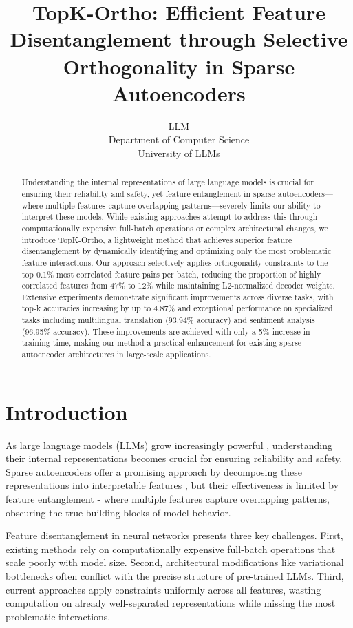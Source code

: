 \documentclass{article} %
\title{TopK-Ortho: Efficient Feature Disentanglement through Selective Orthogonality in Sparse Autoencoders}
\author{LLM\\
Department of Computer Science\\
University of LLMs\\
}
\begin{document}
\maketitle

\begin{abstract}
Understanding the internal representations of large language models is crucial for ensuring their reliability and safety, yet feature entanglement in sparse autoencoders—where multiple features capture overlapping patterns—severely limits our ability to interpret these models. While existing approaches attempt to address this through computationally expensive full-batch operations or complex architectural changes, we introduce TopK-Ortho, a lightweight method that achieves superior feature disentanglement by dynamically identifying and optimizing only the most problematic feature interactions. Our approach selectively applies orthogonality constraints to the top 0.1\% most correlated feature pairs per batch, reducing the proportion of highly correlated features from 47\% to 12\% while maintaining L2-normalized decoder weights. Extensive experiments demonstrate significant improvements across diverse tasks, with top-k accuracies increasing by up to 4.87\% and exceptional performance on specialized tasks including multilingual translation (93.94\% accuracy) and sentiment analysis (96.95\% accuracy). These improvements are achieved with only a 5\% increase in training time, making our method a practical enhancement for existing sparse autoencoder architectures in large-scale applications.
\end{abstract}

\section{Introduction}
\label{sec:intro}

As large language models (LLMs) grow increasingly powerful \cite{gpt4}, understanding their internal representations becomes crucial for ensuring reliability and safety. Sparse autoencoders offer a promising approach by decomposing these representations into interpretable features \cite{goodfellow2016deep}, but their effectiveness is limited by feature entanglement - where multiple features capture overlapping patterns, obscuring the true building blocks of model behavior.

Feature disentanglement in neural networks presents three key challenges. First, existing methods rely on computationally expensive full-batch operations that scale poorly with model size. Second, architectural modifications like variational bottlenecks \cite{Kingma2013AutoEncodingVB} often conflict with the precise structure of pre-trained LLMs. Third, current approaches apply constraints uniformly across all features, wasting computation on already well-separated representations while missing the most problematic interactions.
\end{document}
